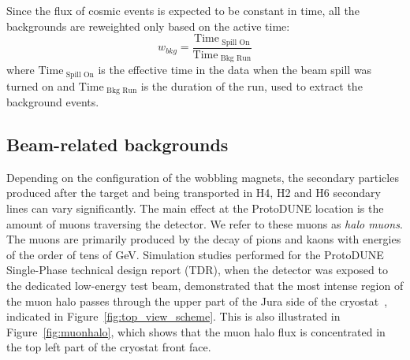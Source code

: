 Since the flux of cosmic events is expected to be constant in time, all the backgrounds are reweighted only based on the active time:
\begin{equation}
    w_{bkg}=\frac{\text{Time}_{\text{ Spill On}}}{\text{Time}_{\text{ Bkg Run}}}
\end{equation}
where ${\text{Time}_{\text{ Spill On}}}$ is the effective time in the data when the beam spill was turned on and ${\text{Time}_{\text{ Bkg Run}}}$ is the duration of the run, used to extract the background events.

\subsection{Beam-related backgrounds}

Depending on the configuration of the wobbling magnets, the secondary particles produced after the target and being transported in H4, H2 and H6 secondary lines can vary significantly. The main effect at the ProtoDUNE location is the amount of muons traversing the detector. We refer to these muons as {\it halo muons}. The muons are primarily produced by the decay of pions and kaons with energies of the order of tens of GeV. Simulation studies performed for the ProtoDUNE Single-Phase technical design report (TDR), when the detector was exposed to the dedicated low-energy test beam, demonstrated that the most intense region of the muon halo passes through the upper part of the Jura side of the cryostat~\cite{DUNE_SP_2017}, indicated in Figure~\ref{fig:top_view_scheme}. This is also illustrated in Figure~\ref{fig:muonhalo}, which shows that the muon halo flux is concentrated in the top left part of the cryostat front face.


